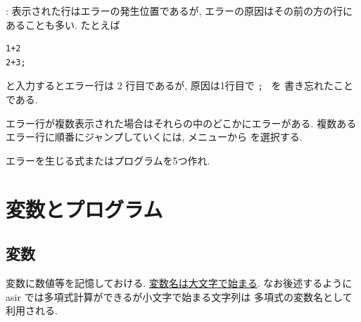 \documentclass{jbook}
\begin{document}
:
表示された行はエラーの発生位置であるが,
エラーの原因はその前の方の行にあることも多い.
たとえば
\begin{screen}
\begin{verbatim}
1+2
2+3;
\end{verbatim}
\end{screen}
と入力するとエラー行は 2 行目であるが, 原因は1行目で {\tt ; } を 
書き忘れたことである.

\bigbreak
エラー行が複数表示された場合はそれらの中のどこかにエラーがある.
複数あるエラー行に順番にジャンプしていくには,
 メニューから  を選択する.
\begin{center}
\end{center}

\begin{problem} \rm
エラーを生じる式またはプログラムを5つ作れ.
\end{problem}


\chapter{ 変数とプログラム }

\section{変数}

\noindent  {}
変数に数値等を記憶しておける.
\underline{変数名は大文字で始まる}.  
なお後述するように asir では多項式計算ができるが小文字で始まる文字列は
多項式の変数名として利用される.   
\end{document}
